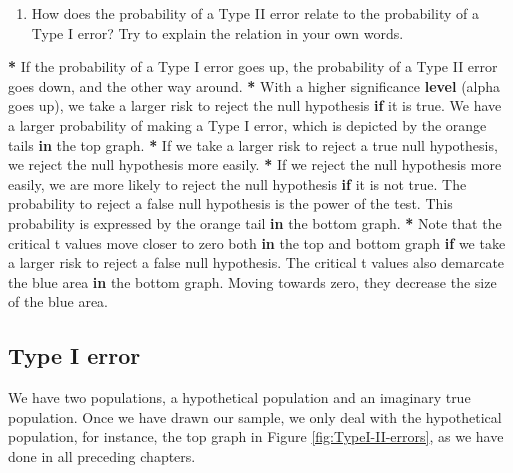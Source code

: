 \documentclass[a4paper]{book}
\newenvironment{Shaded}{\begin{snugshade}}{\end{snugshade}}
\newcommand{\KeywordTok}[1]{\textcolor[rgb]{0,0,0}{\textbf{#1}}}
\newcommand{\StringTok}[1]{\textcolor[rgb]{0.00,0.00,0.00}{#1}}
\newcommand{\ControlFlowTok}[1]{\textcolor[rgb]{0.00,0.00,0.00}{\textbf{#1}}}
\newcommand{\OperatorTok}[1]{\textcolor[rgb]{0.00,0.00,0.00}{\textbf{#1}}}
\newcommand{\NormalTok}[1]{#1}
\providecommand{\tightlist}{%
  \setlength{\itemsep}{0pt}\setlength{\parskip}{0pt}}
\theoremstyle{definition}
\theoremstyle{definition}
\theoremstyle{definition}
\theoremstyle{remark}
\begin{document}
\begin{enumerate}
\def\labelenumi{\arabic{enumi}.}
\setcounter{enumi}{2}
\tightlist
\item
  How does the probability of a Type II error relate to the probability
  of a Type I error? Try to explain the relation in your own words.
\end{enumerate}

\begin{Shaded}
\begin{Highlighting}[]
\OperatorTok{*}\StringTok{ }\NormalTok{If the probability of a Type I error goes up, the probability of a Type II}
\NormalTok{error goes down, and the other way around.}
\OperatorTok{*}\StringTok{ }\NormalTok{With a higher significance }\KeywordTok{level}\NormalTok{ (alpha goes up), we take a larger risk to}
\NormalTok{reject the null hypothesis }\ControlFlowTok{if}\NormalTok{ it is true. We have a larger probability of}
\NormalTok{making a Type I error, which is depicted by the orange tails }\ControlFlowTok{in}\NormalTok{ the top graph.}
\OperatorTok{*}\StringTok{ }\NormalTok{If we take a larger risk to reject a true null hypothesis, we reject the}
\NormalTok{null hypothesis more easily.}
\OperatorTok{*}\StringTok{ }\NormalTok{If we reject the null hypothesis more easily, we are more likely to reject}
\NormalTok{the null hypothesis }\ControlFlowTok{if}\NormalTok{ it is not true. The probability to reject a false null}
\NormalTok{hypothesis is the power of the test. This probability is expressed by the}
\NormalTok{orange tail }\ControlFlowTok{in}\NormalTok{ the bottom graph.}
\OperatorTok{*}\StringTok{ }\NormalTok{Note that the critical t values move closer to zero both }\ControlFlowTok{in}\NormalTok{ the top and}
\NormalTok{bottom graph }\ControlFlowTok{if}\NormalTok{ we take a larger risk to reject a false null hypothesis. The}
\NormalTok{critical t values also demarcate the blue area }\ControlFlowTok{in}\NormalTok{ the bottom graph. Moving}
\NormalTok{towards zero, they decrease the size of the blue area.}
\end{Highlighting}
\end{Shaded}

\subsection{Type I error}\label{type-i-error}

We have two populations, a hypothetical population and an imaginary true
population. Once we have drawn our sample, we only deal with the
hypothetical population, for instance, the top graph in Figure
\ref{fig:TypeI-II-errors}, as we have done in all preceding chapters.
\end{document}
